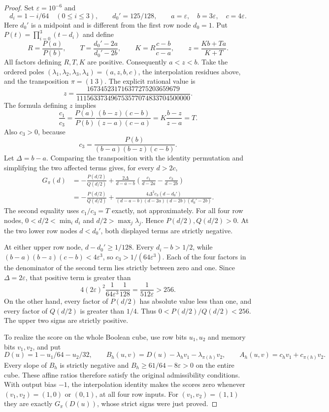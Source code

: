 \documentclass[11pt]{article}
\begin{document}
\begin{proof}
Set $\varepsilon=10^{-6}$ and
\[
 d_i=1-i/64\quad(0\le i\le3),\qquad d_0'=125/128,
 \qquad a=\varepsilon,\quad b=3\varepsilon,\quad c=4\varepsilon.
\]
Here $d_0'$ is a midpoint and is different from the first row node
$d_0=1$. Put $P(t)=\prod_{i=0}^3(t-d_i)$ and define
\[
 R=\frac{P(a)}{P(b)},\qquad
 T=\frac{d_0'-2a}{d_0'-2b},\qquad
 K=R\frac{c-b}{c-a},\qquad z=\frac{Kb+Ta}{K+T}.
\]
All factors defining $R,T,K$ are positive. Consequently $a<z<b$.
Take the ordered poles $(\lambda_1,\lambda_2,\lambda_3,\lambda_4)
=(a,z,b,c)$, the interpolation residues above, and the transposition
$\pi=(1\ 3)$. The explicit rational value is
\[
 z=\frac{167345231716377275203659679}
          {111563373496753577074833704500000}.
\]
The formula defining $z$ implies
\[
 \frac{c_1}{c_3}
 =\frac{P(a)}{P(b)}\frac{(b-z)(c-b)}{(z-a)(c-a)}
 =K\frac{b-z}{z-a}=T.
\]
Also $c_3>0$, because
\[
 c_3=\frac{P(b)}{(b-a)(b-z)(c-b)}.
\]
Let $\Delta=b-a$. Comparing the transposition with the identity
permutation and simplifying the two affected terms gives, for every
$d>2c$,
\[
 \begin{aligned}
 G_\pi(d)
 &= -\frac{P(d/2)}{Q(d/2)}
   +\frac{2\Delta}{d-a-b}
     \left(\frac{c_1}{d-2a}-\frac{c_3}{d-2b}\right)\\
 &= -\frac{P(d/2)}{Q(d/2)}
   +\frac{4\Delta^2c_3(d-d_0')}
    {(d-a-b)(d-2a)(d-2b)(d_0'-2b)}.
 \end{aligned}
\]
The second equality uses $c_1/c_3=T$ exactly, not approximately.
For all four row nodes, $0<d/2<\min_i d_i$ and
$d/2>\max_j\lambda_j$. Hence $P(d/2),Q(d/2)>0$.
At the two lower row nodes $d<d_0'$, both displayed terms are
strictly negative.

At either upper row node, $d-d_0'\ge1/128$.
Every $d_i-b>1/2$, while
$(b-a)(b-z)(c-b)<4\varepsilon^3$, so
$c_3>1/(64\varepsilon^3)$.
Each of the four factors in the denominator of the second term lies
strictly between zero and one. Since $\Delta=2\varepsilon$, that
positive term is greater than
\[
 4(2\varepsilon)^2\frac1{64\varepsilon^3}\frac1{128}
     =\frac1{512\varepsilon}>256.
\]
On the other hand, every factor of $P(d/2)$ has absolute value less
than one, and every factor of $Q(d/2)$ is greater than $1/4$.
Thus $0<P(d/2)/Q(d/2)<256$. The upper two signs are strictly positive.

To realize the score on the whole Boolean cube, use row bits $u_1,u_2$
and memory bits $v_1,v_2$, and put
\[
 D(u)=1-u_1/64-u_2/32,\qquad
 B_h(u,v)=D(u)-\lambda_hv_1-\lambda_{\pi(h)}v_2,
 \qquad
 A_h(u,v)=c_hv_1+c_{\pi(h)}v_2.
\]
Every slope of $B_h$ is strictly negative and
$B_h\ge61/64-8\varepsilon>0$ on the entire cube. These affine ratios
therefore satisfy the original admissibility conditions. With output
bias $-1$, the interpolation identity makes the scores zero whenever
$(v_1,v_2)=(1,0)$ or $(0,1)$, at all four row inputs.
For $(v_1,v_2)=(1,1)$ they are exactly $G_\pi(D(u))$, whose strict
signs were just proved.
\end{proof}
\end{document}
